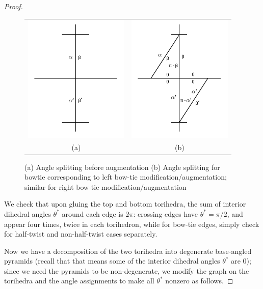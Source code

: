\documentclass[11pt]{amsart}
\theoremstyle{plain}
\theoremstyle{definition}
\begin{document}
\begin{proof}
\begin{figure}
\begin{tabular}{cc}
\includegraphics[width = 5cm]{before_bowtie_angles.png}&
\includegraphics[width = 5cm]{bowtie_angles.png}\\
(a)&(b)
\end{tabular}
\caption{(a) Angle splitting before augmentation 
(b) Angle splitting for bowtie corresponding to
left bow-tie modification/augmentation;
similar for right bow-tie modification/augmentation}
\label{f:bowtie_angles2}
\end{figure}

We check that upon gluing the top and bottom torihedra,
the sum of interior dihedral angles $\theta^*$
around each edge is $2\pi$:
crossing edges have $\theta^* = \pi/2$,
and appear four times, twice in each torihedron,
while for bow-tie edges,
simply check for half-twist and non-half-twist cases
separately.


Now we have a decomposition of the two torihedra into
degenerate base-angled pyramids
(recall that that means some of the
interior dihedral angles $\theta^*$ are 0);
since we need the pyramids to be non-degenerate,
we modify the graph on the torihedra
and the angle assignments to make all $\theta^*$ nonzero
as follows.



\end{proof}
\end{document}

